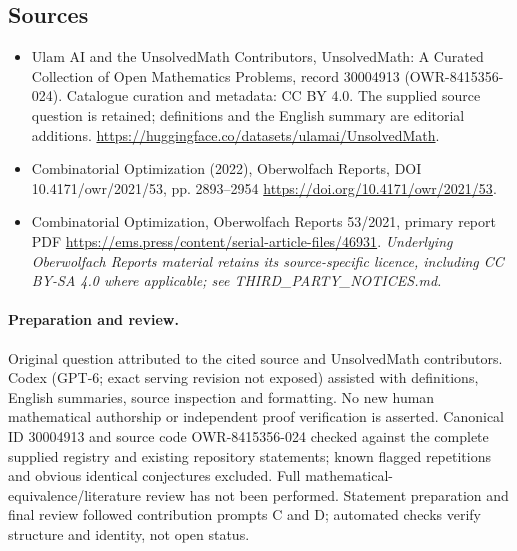 \documentclass[11pt]{article}
\begin{document}
\subsection{Sources}
\begin{itemize}
\item[\hypertarget{source:30004913:1}{S1}] Ulam AI and the UnsolvedMath Contributors, UnsolvedMath: A Curated Collection of Open Mathematics Problems, record 30004913 (OWR-8415356-024). Catalogue curation and metadata: CC BY 4.0. The supplied source question is retained; definitions and the English summary are editorial additions.
\url{https://huggingface.co/datasets/ulamai/UnsolvedMath}.
\item[\hypertarget{source:30004913:2}{S2}] Combinatorial Optimization (2022), Oberwolfach Reports, DOI 10.4171/owr/2021/53, pp. 2893--2954
\url{https://doi.org/10.4171/owr/2021/53}.
\item[\hypertarget{source:30004913:3}{S3}] Combinatorial Optimization, Oberwolfach Reports 53/2021, primary report PDF
\url{https://ems.press/content/serial-article-files/46931}.
\textit{Underlying Oberwolfach Reports material retains its source-specific licence, including CC BY-SA 4.0 where applicable; see THIRD\_PARTY\_NOTICES.md.}
\end{itemize}
\paragraph{Preparation and review.}
Original question attributed to the cited source and UnsolvedMath contributors. Codex (GPT-6; exact serving revision not exposed) assisted with definitions, English summaries, source inspection and formatting. No new human mathematical authorship or independent proof verification is asserted. Canonical ID 30004913 and source code OWR-8415356-024 checked against the complete supplied registry and existing repository statements; known flagged repetitions and obvious identical conjectures excluded. Full mathematical-equivalence/literature review has not been performed. Statement preparation and final review followed contribution prompts C and D; automated checks verify structure and identity, not open status.
\label{end:30004913}
\end{document}
